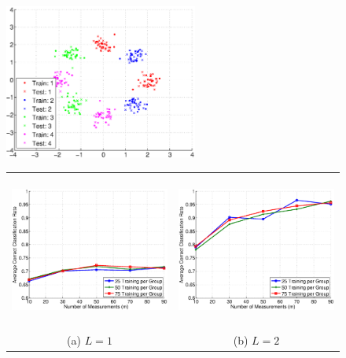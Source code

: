 \documentclass[twoside,11pt]{article}
\begin{document}
\begin{figure}[!htbp]
\centering
\includegraphics[height=2in]{images/Synthetic/8ball_g4_d2/synthetic_5a.eps} 
\begin{tabular}{cc}
\includegraphics[height=2in]{images/Synthetic/8ball_g4_d2/synthetic_5b.eps} &
\includegraphics[height=2in]{images/Synthetic/8ball_g4_d2/synthetic_5c.eps} \\
(a) $L=1$ & (b) $L=2$ \\

\end{tabular}
\end{figure}
\end{document}

